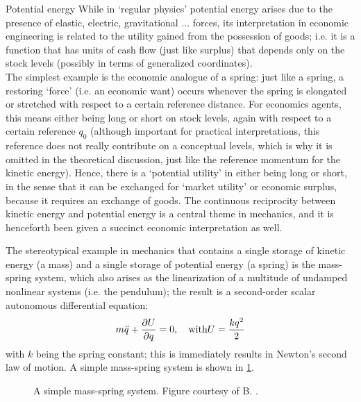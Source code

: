 \begin{econ}{Potential energy}
    While in `regular physics' potential energy arises due to the presence of elastic, electric, gravitational ... forces, its interpretation in economic engineering is related to the utility gained from the possession of goods; i.e. it is a function that has units of cash flow (just like surplus) that depends only on the stock levels (possibly in terms of generalized coordinates).\\

    The simplest example is the economic analogue of a spring: just like a spring, a restoring `force' (i.e. an economic want) occurs whenever the spring is elongated or stretched with respect to a certain reference distance. For economics agents, this means either being long or short on stock levels, again with respect to a certain reference $q_0$ (although important for practical interpretations, this reference does not really contribute on a conceptual levels, which is why it is omitted in the theoretical discussion, just like the reference momentum for the kinetic energy). Hence, there is a `potential utility' in either being long or short, in the sense that it can be exchanged for `market utility' or economic surplus, because it requires an exchange of goods. The continuous reciprocity between kinetic energy and 
    potential energy is a central theme in mechanics, and it is henceforth been given a succinct economic interpretation as well.
\end{econ}
The stereotypical example in mechanics that contains a single storage of kinetic energy (a mass) and a single storage of potential energy (a spring) is the mass-spring system, which also arises as the linearization of a multitude of undamped nonlinear systems (i.e. the pendulum); the result is a second-order scalar autonomous differential equation:
\begin{equation}
    m\ddot{q} + \pdv{U}{q} = 0, \quad \text{with} U = \frac{kq^2}{2}
    \label{eq:mass_spring}
\end{equation}
with $k$ being the spring constant; this is immediately results in Newton's second law of motion. A simple mass-spring system is shown in \cref{fig:mass_spring}.
\begin{figure}[ht]
    \centering
    
    \caption{A simple mass-spring system. Figure courtesy of B. \citet{Krabbenborg2021}.}
    \label{fig:mass_spring}
\end{figure}

